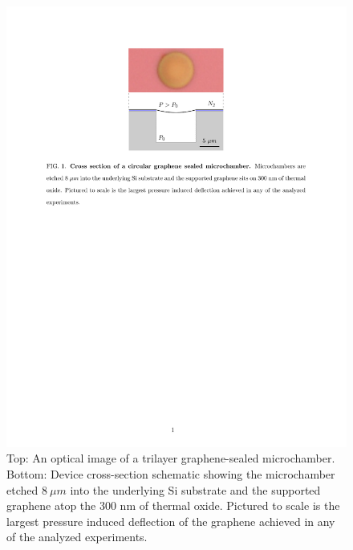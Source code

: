 \begin{figure}
\begin{center}
\includegraphics{Figs_Friction/Figure_1.pdf}
\end{center}
\caption{\label{device} Top: An optical image of a trilayer graphene-sealed microchamber. Bottom: Device cross-section schematic showing the microchamber etched $8 \ \mu m$ into the underlying Si substrate and the supported graphene atop the 300 nm of thermal oxide.  Pictured to scale is the largest pressure induced deflection of the graphene achieved in any of the analyzed experiments.}
\end{figure}

